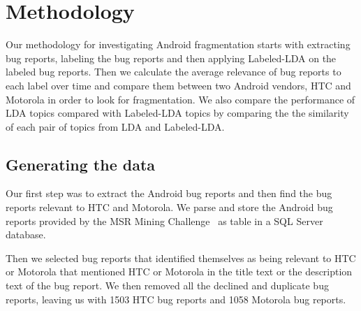 \documentclass[10pt, conference, compsocconf]{IEEEtran}
\begin{document}
\section{Methodology}
\label{sec:methodology}

Our methodology for investigating Android fragmentation starts with extracting
bug reports, labeling the bug reports and then applying
Labeled-LDA on the labeled bug reports.
Then 
 we calculate the average relevance of bug reports to each label
over time \cite{Hindle} and compare them between two Android vendors,
HTC and Motorola in order to look for fragmentation.
We also compare the performance of LDA topics compared with
Labeled-LDA topics by comparing the 
the similarity of each pair of
topics from LDA and Labeled-LDA.

\subsection{Generating the data}


Our first step was to extract the Android bug reports and then find
the bug reports relevant to HTC and Motorola.  We parse and store the
Android bug reports provided by the MSR Mining
Challenge~\cite{MSRChallenge2012} as table in a SQL Server database.


Then we selected bug reports that identified themselves as being
relevant to HTC or Motorola that mentioned HTC or
Motorola in the title text or the description text of the bug report.  
We then removed all the declined and duplicate bug reports, leaving us
with 1503 HTC bug reports and 1058 Motorola bug reports.
\end{document}

